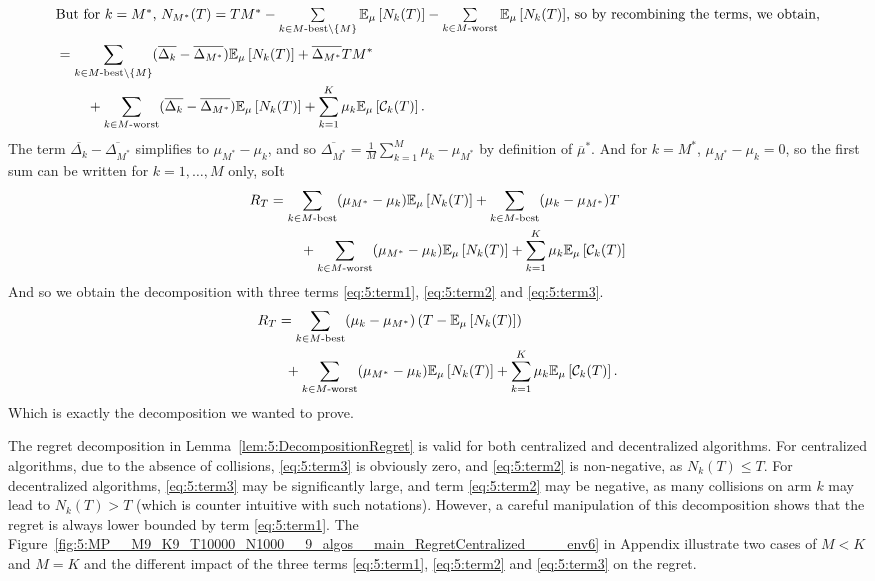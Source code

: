 \begin{smallproof}
\begin{align*}
    \intertext{But for $k = M^*$, $N_{M^*}(T) = T M^* - \sum\limits_{k \in M\text{-}\mathrm{best}\setminus\{M\}} \mathbb{E}_{\mu}\left[ N_k(T) \right] - \sum\limits_{k \in M\text{-}\mathrm{worst}} \mathbb{E}_{\mu}\left[ N_k(T) \right]$, so by recombining the terms, we obtain,}
    &= \sum_{k \in M\text{-}\mathrm{best}\setminus\{M\}} (\overline{\Delta_k} - \overline{\Delta_{M^*}}) \mathbb{E}_{\mu}\left[ N_k(T) \right]
      + \overline{\Delta_{M^*}} T M^* \\
      &\;\;\;\;\;\;\;\; + \sum_{k \in M\text{-}\mathrm{worst}} (\overline{\Delta_k} - \overline{\Delta_{M^*}}) \mathbb{E}_{\mu}\left[ N_k(T) \right]
      + \sum_{k=1}^{K} \mu_k \mathbb{E}_{\mu}\left[ \mathcal{C}_k(T) \right].
  \end{align*}
  The term $\overline{\Delta_k} - \overline{\Delta_{M^*}}$ simplifies to $\mu_{M^*} - \mu_k$, and so $\overline{\Delta_{M^*}} = \frac{1}{M} \sum_{k=1}^{M} \mu_k - \mu_{M^*}$ by definition of $\overline{\mu}^*$. And for $k=M^*$, $\mu_{M^*} - \mu_k = 0$, so the first sum can be written for $k = 1,\dots,M$ only, soIt
  \begin{align*}
    R_T
    &= \sum_{k \in M\text{-}\mathrm{best}} (\mu_{M^*} - \mu_k) \mathbb{E}_{\mu}\left[ N_k(T) \right]
      + \sum_{k \in M\text{-}\mathrm{best}} (\mu_k - \mu_{M^*}) T \\
      &\;\;\;\;\;\;\;\; + \sum_{k \in M\text{-}\mathrm{worst}} (\mu_{M^*} - \mu_k) \mathbb{E}_{\mu}\left[ N_k(T) \right]
      + \sum_{k=1}^{K} \mu_k \mathbb{E}_{\mu}\left[ \mathcal{C}_k(T) \right]
  \end{align*}
  And so we obtain the decomposition with three terms \ref{eq:5:term1}, \ref{eq:5:term2} and \ref{eq:5:term3}.
  \begin{align*}
  R_T
    & = \sum_{k \in M\text{-}\mathrm{best}} (\mu_k - \mu_{M^*}) \left(T - \mathbb{E}_{\mu}\left[ N_k(T) \right]\right) \\
      & \;\; + \sum_{k \in M\text{-}\mathrm{worst}} (\mu_{M^*} - \mu_k) \mathbb{E}_{\mu}\left[ N_k(T) \right]
      + \sum_{k=1}^{K} \mu_k \mathbb{E}_{\mu}\left[ \mathcal{C}_k(T) \right].
  \end{align*}
  Which is exactly the decomposition we wanted to prove.
\end{smallproof}


The regret decomposition in Lemma~\ref{lem:5:DecompositionRegret} is valid for both centralized and decentralized algorithms.
For centralized algorithms, due to the absence of collisions, \ref{eq:5:term3} is obviously zero, and \ref{eq:5:term2} is non-negative, as $N_k(T) \leq T$. For decentralized algorithms, \ref{eq:5:term3} may be significantly large, and term \ref{eq:5:term2} may be negative, as many collisions on arm $k$ may lead to $N_k(T) > T$ (which is counter intuitive with such notations).
However, a careful manipulation of this decomposition shows that the regret is always lower bounded by term \ref{eq:5:term1}.
The Figure~\ref{fig:5:MP__M9_K9_T10000_N1000__9_algos__main_RegretCentralized____env6} in Appendix illustrate two cases of $M<K$ and $M=K$ and the different impact of the three terms \ref{eq:5:term1}, \ref{eq:5:term2} and \ref{eq:5:term3} on the regret.

